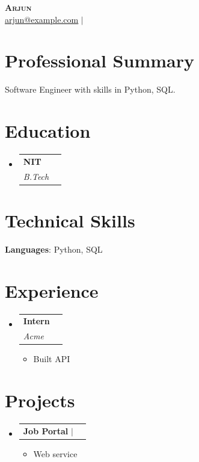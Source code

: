 \documentclass[letterpaper,10pt]{article}
\makeatletter
\newcommand{\resumeItem}[1]{
  \item\small{
    {#1 \vspace{-2pt}}
  }
}
\newcommand{\resumeSubheading}[4]{
  \vspace{-2pt}\item
    \begin{tabular*}{0.97\textwidth}[t]{l@{\extracolsep{\fill}}r}
      \textbf{#1} & #2 \\
      \textit{\small#3} & \textit{\small #4} \\
    \end{tabular*}\vspace{-7pt}
}
\newcommand{\resumeProjectHeading}[2]{
    \item
    \begin{tabular*}{0.97\textwidth}{l@{\extracolsep{\fill}}r}
      \small#1 & #2 \\
    \end{tabular*}\vspace{-7pt}
}
\newcommand{\resumeSubHeadingListStart}{\begin{itemize}[leftmargin=0.15in, label={}]}
\newcommand{\resumeSubHeadingListEnd}{\end{itemize}}
\newcommand{\resumeItemListStart}{\begin{itemize}}
\newcommand{\resumeItemListEnd}{\end{itemize}\vspace{-5pt}}
\makeatother
\begin{document}
\begin{center}
    \textbf{\Huge \scshape Arjun} \\ \vspace{2pt}
    \small 
        \href{mailto:arjun@example.com}{\underline{arjun@example.com}} $|$             \end{center}

\section{Professional Summary}
\small{Software Engineer with skills in Python, SQL.}
\vspace{2pt}

\section{Education}
  \resumeSubHeadingListStart
          \resumeSubheading
        {NIT}{}
        {B.Tech}{}
      \resumeSubHeadingListEnd

\section{Technical Skills}
 \begin{itemize}[leftmargin=0.15in, label={}]
    \small{\item{
                        \textbf{Languages}: Python, SQL \\
                                                                          }}
 \end{itemize}

\section{Experience}
  \resumeSubHeadingListStart
          \resumeSubheading
        {Intern}{}
        {Acme}{}
        \resumeItemListStart
                      \resumeItem{Built API}
                  \resumeItemListEnd
      \resumeSubHeadingListEnd

\section{Projects}
    \resumeSubHeadingListStart
              \resumeProjectHeading
          {\textbf{Job Portal} $|$ \emph{}}{}
          \resumeItemListStart
                          \resumeItem{Web service}
                      \resumeItemListEnd
          \resumeSubHeadingListEnd

\end{document}
